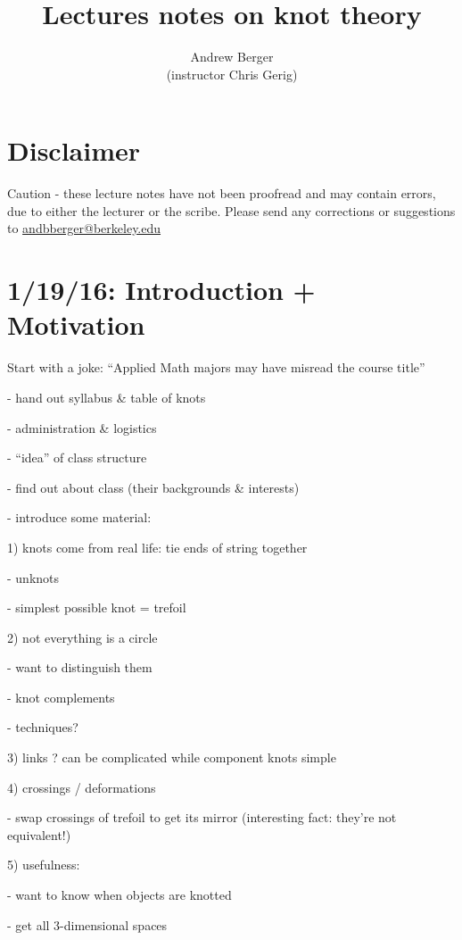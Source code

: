 \documentclass[11pt]{article}
\title{Lectures notes on knot theory}
\author{Andrew Berger\\(instructor Chris Gerig)}
\theoremstyle{plain}
\theoremstyle{definition}
\begin{document}
\maketitle

\clearpage

\tableofcontents


\clearpage
\section{Disclaimer}

Caution - these lecture notes have not been proofread and may contain errors, due to either the lecturer or the scribe. Please send any corrections or suggestions to \href{mailto:andbberger@berkeley.edu}{andbberger@berkeley.edu}

\clearpage

\section{1/19/16: Introduction + Motivation}

Start with a joke: ``Applied Math majors may have misread the course title''

\bigskip
- hand out syllabus \& table of knots

- administration \& logistics

- ``idea'' of class structure

- find out about class (their backgrounds \& interests)

\bigskip
- introduce some material:

1) knots come from real life: tie ends of string together

- unknots

- simplest possible knot = trefoil

2) not everything is a circle

- want to distinguish them

- knot complements

- techniques?

3) links ? can be complicated while component knots simple

4) crossings / deformations

- swap crossings of trefoil to get its mirror (interesting fact: they're not equivalent!)

5) usefulness:

- want to know when objects are knotted

- get all 3-dimensional spaces
\end{document}

